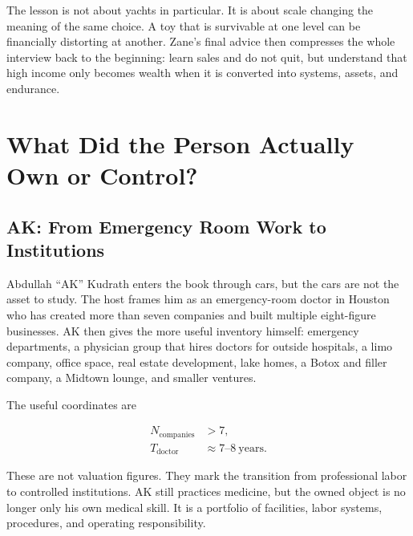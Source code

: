 \documentclass[11pt,oneside]{book}
\begin{document}
The lesson is not about yachts in particular. It is about scale changing the meaning of the same choice. A toy that is survivable at one level can be financially distorting at another. Zane's final advice then compresses the whole interview back to the beginning: learn sales and do not quit, but understand that high income only becomes wealth when it is converted into systems, assets, and endurance.


\chapter{What Did the Person Actually Own or Control?}

\section{AK: From Emergency Room Work to Institutions}

Abdullah ``AK'' Kudrath enters the book through cars, but the cars are not the asset to study. The host frames him as an emergency-room doctor in Houston who has created more than seven companies and built multiple eight-figure businesses. AK then gives the more useful inventory himself: emergency departments, a physician group that hires doctors for outside hospitals, a limo company, office space, real estate development, lake homes, a Botox and filler company, a Midtown lounge, and smaller ventures.

The useful coordinates are

\begin{align}
N_{\mathrm{companies}} &> 7,\\
T_{\mathrm{doctor}} &\approx 7\text{--}8\ \mathrm{years}.
\end{align}

These are not valuation figures. They mark the transition from professional labor to controlled institutions. AK still practices medicine, but the owned object is no longer only his own medical skill. It is a portfolio of facilities, labor systems, procedures, and operating responsibility.
\end{document}
